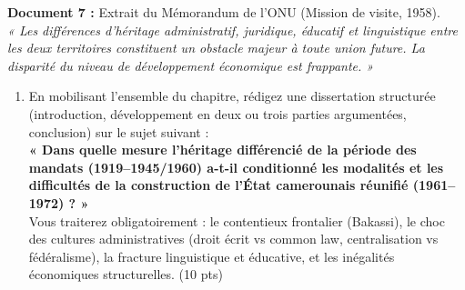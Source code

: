 \documentclass[11pt]{article}
\begin{document}
\begin{exercice}
\textbf{Document 7 :} Extrait du Mémorandum de l'ONU (Mission de visite, 1958). \\
\textit{« Les différences d'héritage administratif, juridique, éducatif et linguistique entre les deux territoires constituent un obstacle majeur à toute union future. La disparité du niveau de développement économique est frappante. »}

\begin{enumerate}
    \item En mobilisant l'ensemble du chapitre, rédigez une dissertation structurée (introduction, développement en deux ou trois parties argumentées, conclusion) sur le sujet suivant : \\
    \textbf{« Dans quelle mesure l'héritage différencié de la période des mandats (1919--1945/1960) a-t-il conditionné les modalités et les difficultés de la construction de l'État camerounais réunifié (1961--1972) ? »} \\
    Vous traiterez obligatoirement : le contentieux frontalier (Bakassi), le choc des cultures administratives (droit écrit vs common law, centralisation vs fédéralisme), la fracture linguistique et éducative, et les inégalités économiques structurelles. (10 pts)
\end{enumerate}
\end{exercice}
\end{document}
